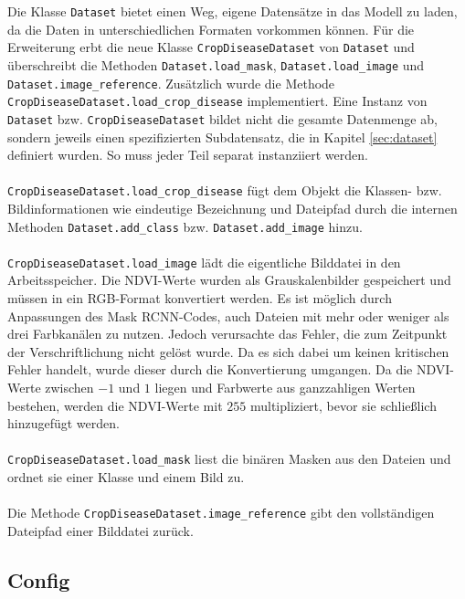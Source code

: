 Die Klasse \texttt{Dataset} bietet einen Weg, eigene Datensätze in das Modell zu laden, da die Daten in unterschiedlichen Formaten vorkommen können. Für die Erweiterung erbt die neue Klasse \texttt{CropDiseaseDataset} von \texttt{Dataset} und überschreibt die Methoden \texttt{Dataset.load\_mask}, \texttt{Dataset.load\_image} und \texttt{Dataset.image\_reference}. Zusätzlich wurde die Methode \texttt{CropDiseaseDataset.load\_crop\_disease} implementiert. Eine Instanz von \texttt{Dataset} bzw. \texttt{CropDiseaseDataset} bildet nicht die gesamte Datenmenge ab, sondern jeweils einen spezifizierten Subdatensatz, die in Kapitel \ref{sec:dataset} definiert wurden. So muss jeder Teil separat instanziiert werden. 
\\\\
\texttt{CropDiseaseDataset.load\_crop\_disease} fügt dem Objekt die Klassen- bzw. Bildinformationen wie eindeutige Bezeichnung und Dateipfad durch die internen Methoden \texttt{Dataset.add\_class} bzw. \texttt{Dataset.add\_image} hinzu. 
\\\\
\texttt{CropDiseaseDataset.load\_image} lädt die eigentliche Bilddatei in den Arbeitsspeicher. Die NDVI-Werte wurden als Grauskalenbilder gespeichert und müssen in ein RGB-Format konvertiert werden. Es ist möglich durch Anpassungen des Mask RCNN-Codes, auch Dateien mit mehr oder weniger als drei Farbkanälen zu nutzen. Jedoch verursachte das Fehler, die zum Zeitpunkt der Verschriftlichung nicht gelöst wurde. Da es sich dabei um keinen kritischen Fehler handelt, wurde dieser durch die Konvertierung umgangen. Da die NDVI-Werte zwischen $-1$ und $1$ liegen und Farbwerte aus ganzzahligen Werten bestehen, werden die NDVI-Werte mit $255$ multipliziert, bevor sie schließlich hinzugefügt werden.
\\\\
\texttt{CropDiseaseDataset.load\_mask} liest die binären Masken aus den Dateien und ordnet sie einer Klasse und einem Bild zu. 
\\\\
Die Methode \texttt{CropDiseaseDataset.image\_reference} gibt den vollständigen Dateipfad einer Bilddatei zurück.

\subsection{Config}

